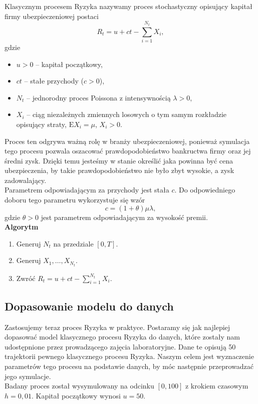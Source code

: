 \documentclass[12pt]{mwart}
\begin{document}
	\noindent Klasycznym procesem Ryzyka nazywamy proces stochastyczny opisujący kapitał firmy ubezpieczeniowej postaci
	$$ R_t = u + ct - \sum_{i=1}^{N_t} X_i, $$
	gdzie
	\begin{itemize}[label={\boldmath $\cdot$}]
		\item $u > 0$ -- kapitał początkowy,
		\item $ct$ -- stałe przychody ($c > 0$),
		\item $N_t$ -- jednorodny proces Poissona z intensywnością $\lambda > 0$,
		\item $X_i$ -- ciąg niezależnych zmiennych losowych o tym samym rozkładzie opisujący straty, $\mathrm{E}X_i = \mu$, $X_i > 0$.
	\end{itemize}
	Proces ten odgrywa ważną rolę w branży ubezpieczeniowej, ponieważ symulacja tego procesu pozwala oszacować prawdopodobieństwo bankructwa firmy oraz jej średni zysk. Dzięki temu jesteśmy w stanie określić jaka powinna być cena ubezpieczenia, by takie prawdopodobieństwo nie było zbyt wysokie, a zysk zadowalający.\vspace{1.5mm}\\
	Parametrem odpowiadającym za przychody jest stała $c$. Do odpowiedniego doboru tego parametru wykorzystuje się wzór
	$$ c = (1 + \theta)\mu\lambda, $$
	gdzie $\theta > 0$ jest parametrem odpowiadającym za wysokość premii.\\
	
	\noindent \textbf{Algorytm}
	\begin{enumerate}
		\item Generuj $N_t$ na przedziale $[0, T]$.
		\item Generuj $X_1, \dots, X_{N_t}$.
		\item Zwróć $R_t = u + ct - \sum\limits_{i=1}^{N_t} X_i$.
	\end{enumerate}
	
	
	
	\subsection{Dopasowanie modelu do danych}
	
	\noindent Zastosujemy teraz proces Ryzyka w praktyce. Postaramy się jak najlepiej dopasować model klasycznego procesu Ryzyka do danych, które zostały nam udostępnione przez prowadzącego zajęcia laboratoryjne. Dane te opisują 50 trajektorii pewnego klasycznego procesu Ryzyka. Naszym celem jest wyznaczenie parametrów tego procesu na podstawie danych, by móc następnie przeprowadzać jego symulacje.\vspace{1.5mm}\\
	Badany proces został wysymulowany na odcinku $[0, 100]$ z krokiem czasowym $h = 0,01$. Kapitał początkowy wynosi $u = 50$.
	
\end{document}
